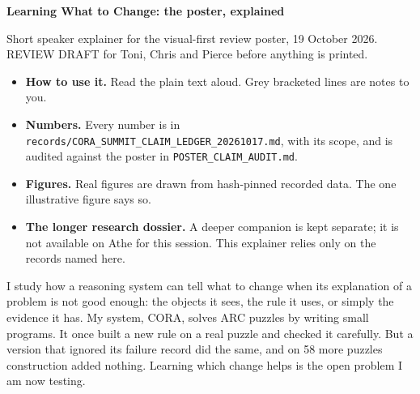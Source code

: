 \documentclass[11pt]{article}
\newcommand{\sub}[1]{\par\needspace{6\baselineskip}\vspace{0.5em}{\large\bfseries\color{accent}#1}\par}
\begin{document}
{\LARGE\bfseries Learning What to Change: the poster, explained\par}
\vspace{0.2em}
{\color{ink2} Short speaker explainer for the visual-first review poster, 19 October 2026. REVIEW DRAFT for Toni,
Chris and Pierce before anything is printed.\par}
\begin{itemize}
  \item \textbf{How to use it.} Read the plain text aloud. Grey bracketed lines are notes to you.
  \item \textbf{Numbers.} Every number is in \texttt{records/CORA\_SUMMIT\_CLAIM\_LEDGER\_20261017.md}, with its
        scope, and is audited against the poster in \texttt{POSTER\_CLAIM\_AUDIT.md}.
  \item \textbf{Figures.} Real figures are drawn from hash-pinned recorded data. The one illustrative figure says so.
  \item \textbf{The longer research dossier.} A deeper companion is kept separate; it is not available on Athe for
        this session. This explainer relies only on the records named here.
\end{itemize}

\sub{The 20-second version}
I study how a reasoning system can tell what to change when its explanation of a problem is not good enough: the
objects it sees, the rule it uses, or simply the evidence it has. My system, CORA, solves ARC puzzles by writing small
programs. It once built a new rule on a real puzzle and checked it carefully. But a version that ignored its failure
record did the same, and on 58 more puzzles construction added nothing. Learning which change helps is the open
problem I am now testing.
\end{document}

